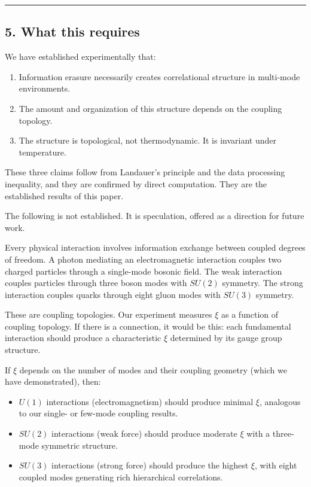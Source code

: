 \documentclass[
  11pt,
  a4paper]{article}
\providecommand{\tightlist}{%
  \setlength{\itemsep}{0pt}\setlength{\parskip}{0pt}}
\begin{document}
\begin{center}\rule{0.5\linewidth}{0.5pt}\end{center}

\subsection{5. What this requires}\label{what-this-requires}

We have established experimentally that:

\begin{enumerate}
\def\labelenumi{\arabic{enumi}.}
\tightlist
\item
  Information erasure necessarily creates correlational structure in
  multi-mode environments.
\item
  The amount and organization of this structure depends on the coupling
  topology.
\item
  The structure is topological, not thermodynamic. It is invariant under
  temperature.
\end{enumerate}

These three claims follow from Landauer's principle and the data
processing inequality, and they are confirmed by direct computation.
They are the established results of this paper.

The following is not established. It is speculation, offered as a
direction for future work.

Every physical interaction involves information exchange between coupled
degrees of freedom. A photon mediating an electromagnetic interaction
couples two charged particles through a single-mode bosonic field. The
weak interaction couples particles through three boson modes with
\(SU(2)\) symmetry. The strong interaction couples quarks through eight
gluon modes with \(SU(3)\) symmetry.

These are coupling topologies. Our experiment measures \(\xi\) as a
function of coupling topology. If there is a connection, it would be
this: each fundamental interaction should produce a characteristic
\(\xi\) determined by its gauge group structure.

If \(\xi\) depends on the number of modes and their coupling geometry
(which we have demonstrated), then:

\begin{itemize}
\tightlist
\item
  \(U(1)\) interactions (electromagnetism) should produce minimal
  \(\xi\), analogous to our single- or few-mode coupling results.
\item
  \(SU(2)\) interactions (weak force) should produce moderate \(\xi\)
  with a three-mode symmetric structure.
\item
  \(SU(3)\) interactions (strong force) should produce the highest
  \(\xi\), with eight coupled modes generating rich hierarchical
  correlations.
\end{itemize}
\end{document}
